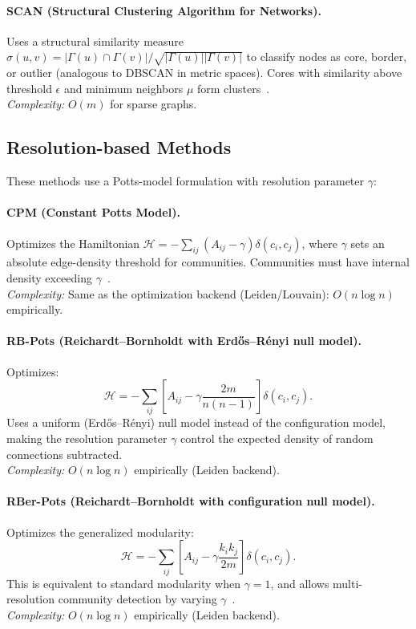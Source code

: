 \documentclass[11pt]{article}
\begin{document}
\paragraph{SCAN (Structural Clustering Algorithm for Networks).}
Uses a structural similarity measure $\sigma(u,v) = |\Gamma(u)\cap\Gamma(v)|/\sqrt{|\Gamma(u)||\Gamma(v)|}$ to classify nodes as core, border, or outlier (analogous to DBSCAN in metric spaces). Cores with similarity above threshold $\epsilon$ and minimum neighbors $\mu$ form clusters~\citep{santo_fortunato_93a74814}.\\
\emph{Complexity:} $O(m)$ for sparse graphs.

\subsection{Resolution-based Methods}

These methods use a Potts-model formulation with resolution parameter $\gamma$:

\paragraph{CPM (Constant Potts Model).}
Optimizes the Hamiltonian $\mathcal{H} = -\sum_{ij}(A_{ij} - \gamma)\delta(c_i, c_j)$, where $\gamma$ sets an absolute edge-density threshold for communities. Communities must have internal density exceeding $\gamma$~\citep{traag_leiden_2019}.\\
\emph{Complexity:} Same as the optimization backend (Leiden/Louvain): $O(n\log n)$ empirically.

\paragraph{RB-Pots (Reichardt--Bornholdt with Erdős--Rényi null model).}
Optimizes:
\[
\mathcal{H} = -\sum_{ij}\left[A_{ij} - \gamma\frac{2m}{n(n-1)}\right]\delta(c_i, c_j).
\]
Uses a uniform (Erdős--Rényi) null model instead of the configuration model, making the resolution parameter $\gamma$ control the expected density of random connections subtracted.\\
\emph{Complexity:} $O(n\log n)$ empirically (Leiden backend).

\paragraph{RBer-Pots (Reichardt--Bornholdt with configuration null model).}
Optimizes the generalized modularity:
\[
\mathcal{H} = -\sum_{ij}\left[A_{ij} - \gamma\frac{k_i k_j}{2m}\right]\delta(c_i, c_j).
\]
This is equivalent to standard modularity when $\gamma=1$, and allows multi-resolution community detection by varying $\gamma$~\citep{santo_fortunato_93a74814}.\\
\emph{Complexity:} $O(n\log n)$ empirically (Leiden backend).
\end{document}
